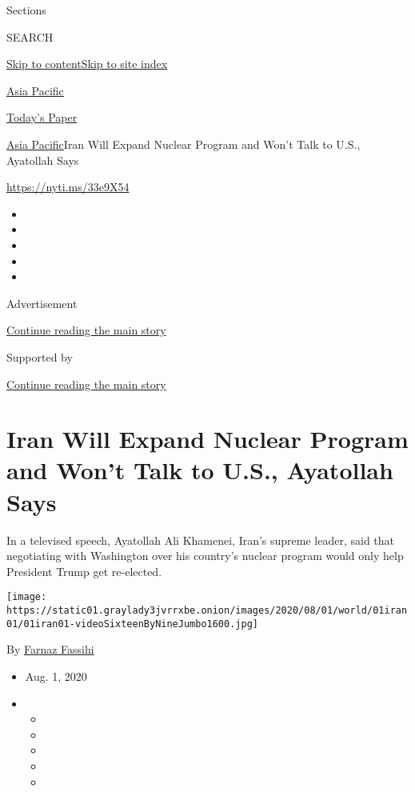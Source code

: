Sections

SEARCH

\protect\hyperlink{site-content}{Skip to
content}\protect\hyperlink{site-index}{Skip to site index}

\href{https://www.nytimes3xbfgragh.onion/section/world/asia}{Asia
Pacific}

\href{https://myaccount.nytimes3xbfgragh.onion/auth/login?response_type=cookie\&client_id=vi}{}

\href{https://www.nytimes3xbfgragh.onion/section/todayspaper}{Today's
Paper}

\href{/section/world/asia}{Asia Pacific}\textbar{}Iran Will Expand
Nuclear Program and Won't Talk to U.S., Ayatollah Says

\href{https://nyti.ms/33e9X54}{https://nyti.ms/33e9X54}

\begin{itemize}
\item
\item
\item
\item
\item
\end{itemize}

Advertisement

\protect\hyperlink{after-top}{Continue reading the main story}

Supported by

\protect\hyperlink{after-sponsor}{Continue reading the main story}

\hypertarget{iran-will-expand-nuclear-program-and-wont-talk-to-us-ayatollah-says}{%
\section{Iran Will Expand Nuclear Program and Won't Talk to U.S.,
Ayatollah
Says}\label{iran-will-expand-nuclear-program-and-wont-talk-to-us-ayatollah-says}}

In a televised speech, Ayatollah Ali Khamenei, Iran's supreme leader,
said that negotiating with Washington over his country's nuclear program
would only help President Trump get re-elected.

\texttt{[image: https://static01.graylady3jvrrxbe.onion/images/2020/08/01/world/01iran01/01iran01-videoSixteenByNineJumbo1600.jpg]}

By \href{https://www.nytimes3xbfgragh.onion/by/farnaz-fassihi}{Farnaz
Fassihi}

\begin{itemize}
\item
  Aug. 1, 2020
\item
  \begin{itemize}
  \item
  \item
  \item
  \item
  \item
  \end{itemize}
\end{itemize}

